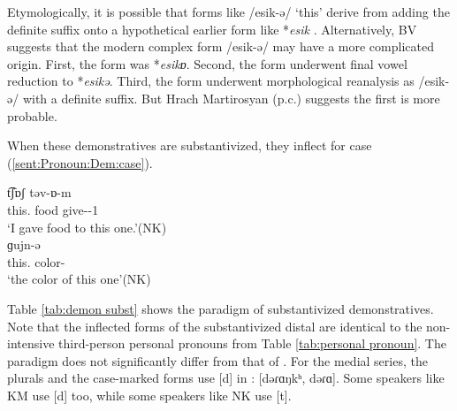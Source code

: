 Etymologically, it is possible that forms like /esik-ə/ `this' derive from adding the definite suffix onto a hypothetical earlier form like *\textit{esik}  \citep[cf.][195ff]{Adjarian-1954-Liakatar2}. Alternatively, BV suggests that the modern complex form /esik-ə/ may have a more complicated origin. First, the form was  *\textit{esikɒ}. Second, the form  underwent final vowel reduction to *\textit{esikə}.  Third, the form underwent  morphological reanalysis as /esik-ə/ with a definite suffix. But Hrach Martirosyan (p.c.) suggests the first is more probable.  

When these demonstratives are substantivized, they inflect for case (\ref{sent:Pronoun:Dem:case}).

\begin{exe}
	\ex \label{sent:Pronoun:Dem:case}
	\begin{xlist}
		
		\ex {} {t͡ʃɒʃ} {təv-ɒ-m}  
		\\
		this.{\dat} food give-{\pst}-1{\sg}
		\\
		\trans		`I gave food to this one.'\hfill (NK)
		\\
		\ex {} {ɡujn-ə}
		\\
		this.{\gen} color-{}
		\\
		\trans	`the color of this one'\hfill (NK)
		\\
	\end{xlist}
\end{exe}



\begin{sloppypar}
Table \ref{tab:demon subst} shows the paradigm of substantivized demonstratives.   Note that the inflected forms of the substantivized distal are identical to the non-intensive third-person personal pronouns from Table \ref{tab:personal pronoun}. The {\iaIA} paradigm does not significantly differ from that of {\seaSEA} \citep[129]{DumTragut-2009-ArmenianReferenceGrammar}. For the medial series, the plurals and the case-marked forms use [d] in {\seaSEA}: [dəɾɑŋkʰ, dəɾɑ]. Some {\iaIA} speakers like KM use [d] too,  while some {\iaIA} speakers like NK use [t]. 
\end{sloppypar}

